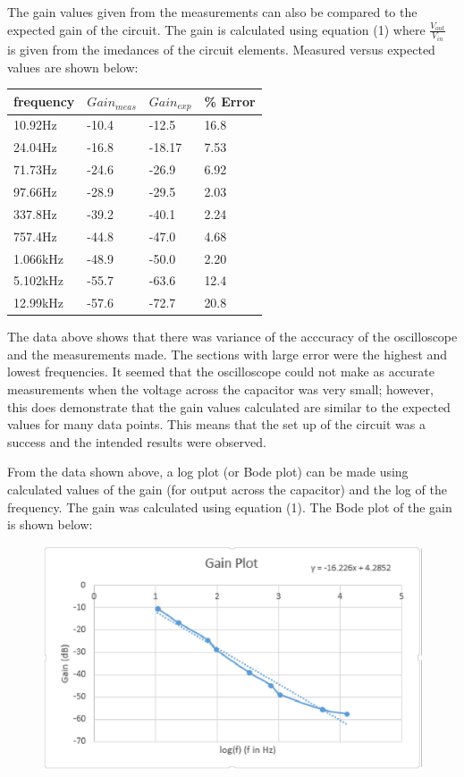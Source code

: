 \documentclass[twocolumn, amsmath]{revtex4}
\begin{document}
The gain values given from the measurements can also be compared to the expected gain  of the circuit. The gain is calculated using equation (1) where  $\frac{V_{out}}{V_{in}}$ is given from the imedances of the circuit elements. Measured versus expected values are shown below:
\begin{center}
    \begin{tabular}{| l | l | l | l |}
    \hline
    frequency &  $Gain_{meas}$  & $Gain_{exp}$ & \% Error  \\ \hline
 
    10.92Hz	& -10.4	& -12.5  &  16.8   \\ \hline
    24.04Hz 	& -16.8	& -18.17 &  7.53 \\ \hline
    71.73Hz   	& -24.6	& -26.9	&  6.92	    \\ \hline
    97.66Hz   	& -28.9	& -29.5	&  2.03	  \\ \hline
    337.8Hz    	& -39.2	& -40.1	&  2.24  \\ \hline
    757.4Hz    	& -44.8	& -47.0	&  4.68    \\ \hline
    1.066kHz   & -48.9	& -50.0	&  2.20	   \\ \hline
    5.102kHz   & -55.7	& -63.6	&  12.4	   \\ \hline
    12.99kHz   & -57.6	& -72.7	&  20.8	  \\
    \hline
    \end{tabular}
\end{center}

The data above shows that there was variance of the acccuracy of the oscilloscope and the measurements made. The sections with large error were the highest and lowest frequencies. It seemed that the oscilloscope could not make as accurate measurements when the voltage across the capacitor was very small; however, this does demonstrate that the gain values calculated are similar to the expected values for many data points. This means that the set up of the circuit was a success and the intended results were observed.

From the data shown above, a log plot (or Bode plot) can be made using calculated values of the gain (for output across the capacitor) and the log of the frequency. The gain was calculated using equation (1). The Bode plot of the gain is shown below:

\begin{figure}[h]  

\includegraphics[scale = 0.5]{gainplot.eps}  
\end{figure}
\end{document}
